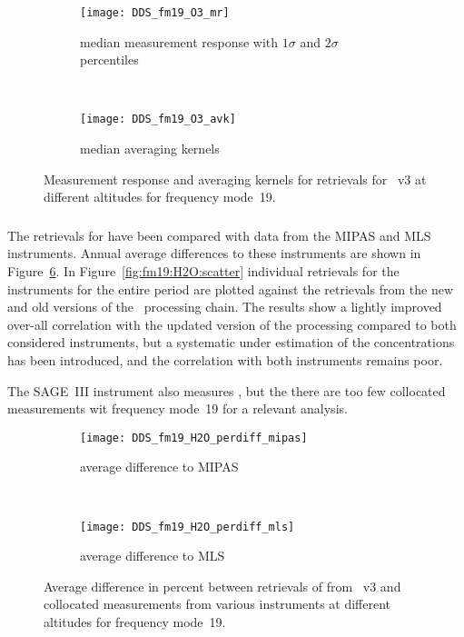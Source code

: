 \begin{figure}[htpb]
    \centering
    \begin{subfigure}[b]{0.49\textwidth}
        \texttt{[image: DDS\_fm19\_O3\_mr]}
        \caption{median measurement response with $1\sigma$ and $2\sigma$
        percentiles}
        \label{fig:fm19:O3:mr}
    \end{subfigure}
    \,
    \begin{subfigure}[b]{0.49\textwidth}
        \texttt{[image: DDS\_fm19\_O3\_avk]}
        \caption{median averaging kernels\newline~}
        \label{fig:fm19:O3:avk}
    \end{subfigure}
    \caption{Measurement response and averaging kernels for 
    retrievals for \smr~v3 at different altitudes for frequency mode~19.}
    \label{fig:fm19:O3:mr_avk}
\end{figure}



\subsubsection{}
\label{sec:fm19:comparison:H2O}
The retrievals for  have been compared with data from the MIPAS and
MLS instruments.  Annual average differences to these instruments are shown in
Figure~\ref{fig:fm19:H2O:profiles}. In Figure~\ref{fig:fm19:H2O:scatter}
individual retrievals for the instruments for the entire period are plotted
against the retrievals from the new and old versions of the \smr\ processing
chain. The results show a lightly improved over-all correlation with the
updated version of the processing compared to both considered instruments, but
a systematic under estimation of the concentrations has been introduced, and
the correlation with both instruments remains poor.

The SAGE~III instrument also measures , but the there are too few
collocated measurements wit frequency mode~19 for a relevant analysis.

\begin{figure}[htpb]
    \centering
    \begin{subfigure}[b]{0.49\textwidth}
        \texttt{[image: DDS\_fm19\_H2O\_perdiff\_mipas]}
        \caption{average difference to MIPAS}
        \label{fig:fm19:H2O:profiles:MIPAS}
    \end{subfigure}
    \,
    \begin{subfigure}[b]{0.49\textwidth}
        \texttt{[image: DDS\_fm19\_H2O\_perdiff\_mls]}
        \caption{average difference to MLS}
        \label{fig:fm19:H2O:profiles:MLS}
    \end{subfigure}
    \caption{Average difference in percent between retrievals of 
    from \smr~v3 and collocated measurements from various instruments at
    different altitudes for frequency mode~19.}

    \label{fig:fm19:H2O:profiles}
\end{figure}

